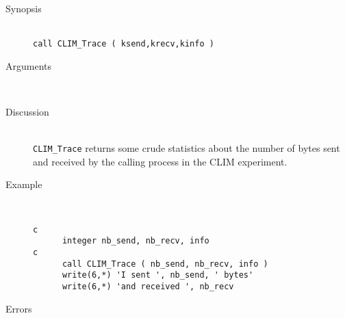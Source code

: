 \begin{description}
  \item[Synopsis]~ \\[10pt]
    {\tt call CLIM\_Trace ( ksend,krecv,kinfo )}
  \item[Arguments]~
  \item[Discussion]~\\[10pt]
    {\tt CLIM\_Trace} returns some crude statistics about the number of
    bytes sent and received by the calling process in the CLIM experiment.
  \item[Example]~
    \begin{verbatim}
c
      integer nb_send, nb_recv, info
c
      call CLIM_Trace ( nb_send, nb_recv, info )
      write(6,*) 'I sent ', nb_send, ' bytes'
      write(6,*) 'and received ', nb_recv
    \end{verbatim}
  \item[Errors]~\\[10pt]
    \begin{tabular}{l l p{10cm} }
    \end{tabular}
\end{description}
%
%
